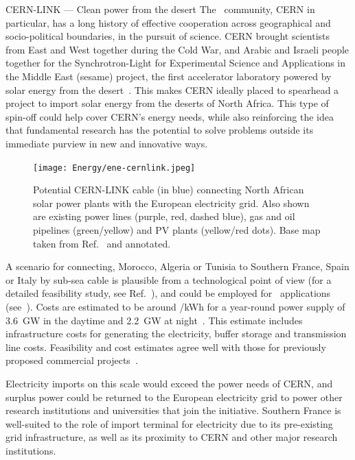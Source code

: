 \documentclass[../SustainableHEP.tex]{subfiles}
\begin{document}



\begin{casestudy}{CERN-LINK --- Clean power from the desert}%
The \ACR\ community, CERN in particular, has a long history of effective cooperation across geographical and socio-political boundaries, in the pursuit of science.  
CERN brought scientists from East and West together during the Cold War, and Arabic and Israeli people together for the  Synchrotron-Light for Experimental Science and Applications in the Middle East (\acrshort{sesame}) project, the first accelerator laboratory powered by solar energy from the desert~\cite{Sesame}. This makes CERN ideally placed to spearhead a project to import solar energy from the deserts of North Africa.  This type of spin-off could help cover CERN's energy needs, while also reinforcing the idea that fundamental research has the potential to solve problems outside its immediate purview in new and innovative ways.


\begin{figure}
\captionsetup{type=figure}
     \texttt{[image: Energy/ene-cernlink.jpeg]}
     \caption[Map for CERN-LINK]{Potential CERN-LINK cable (in blue) connecting North African solar power plants with the European electricity grid. Also shown are existing power lines (purple, red, dashed blue), gas and oil pipelines (green/yellow) and PV plants (yellow/red dots). Base map taken from Ref.~\cite{OpenMap} and annotated.}
     \label{fig:ene-cernlink}
\end{figure}


A scenario for connecting, \eg Morocco, Algeria or Tunisia to Southern France, Spain or Italy by sub-sea cable is plausible from a technological point of view (for a detailed feasibility study, see Ref.~\cite{MoroccoHVDV}), and could be employed for \ACR\ applications (see~). Costs are estimated to be around /kWh for a year-round power supply of 3.6~GW in the daytime and 2.2~GW at night~\cite{Dueren, Dueren+2011+263+275, Hampp}. This estimate includes infrastructure costs for generating the electricity, buffer storage and transmission line costs. Feasibility and cost estimates agree well with those for previously proposed commercial projects~\cite{Xlinks}.

Electricity imports on this scale would exceed the power needs of CERN, and surplus power could be returned to the European electricity grid to power other research institutions and universities that join the initiative. Southern France is well-suited to the role of import terminal for electricity due to its pre-existing grid infrastructure, as well as its proximity to CERN and other major research institutions. 


\end{casestudy}
\end{document}
